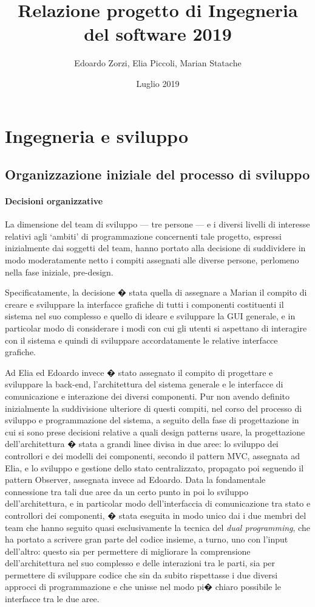 \documentclass[final, smallexted]{svjour3}
\title{Relazione progetto di Ingegneria del software 2019}
\author{Edoardo Zorzi, Elia Piccoli, Marian Statache}
\date{Luglio 2019}
\begin{document}
\maketitle

\newpage
\section{Ingegneria e sviluppo}
\subsection{Organizzazione iniziale del processo di sviluppo}

\paragraph{\textbf{Decisioni organizzative}}
La dimensione del team di sviluppo --- tre persone --- e i diversi livelli di interesse relativi agli `ambiti' di programmazione concernenti tale progetto, espressi inizialmente dai soggetti del team, hanno portato alla decisione di suddividere in modo moderatamente netto i compiti assegnati alle diverse persone, perlomeno nella fase iniziale, pre-design. 

Specificatamente, la decisione � stata quella di assegnare a Marian il compito di creare e sviluppare la interfacce grafiche di tutti i componenti costituenti il sistema nel suo complesso e quello di ideare e sviluppare la GUI generale, e in particolar modo di considerare i modi con cui gli utenti si aspettano di interagire con il sistema e quindi di sviluppare accordatamente le relative interfacce grafiche.

Ad Elia ed Edoardo invece � stato assegnato il compito di progettare e sviluppare la back-end, l'architettura del sistema generale e le interfacce di comunicazione e interazione dei diversi componenti. Pur non avendo definito inizialmente la suddivisione ulteriore di questi compiti, nel corso del processo di sviluppo e programmazione del sistema, a seguito della fase di progettazione in cui si sono prese decisioni relative a quali design patterns usare, la progettazione dell'architettura � stata a grandi linee divisa in due aree: lo sviluppo dei controllori e dei modelli dei componenti, secondo il pattern MVC, assegnata ad Elia, e lo sviluppo e gestione dello stato centralizzato, propagato poi seguendo il pattern Observer, assegnata invece ad Edoardo. Data la fondamentale connessione tra tali due aree da un certo punto in poi lo sviluppo dell'architettura, e in particolar modo dell'interfaccia di comunicazione tra stato e controllori dei componenti, � stata eseguita in modo unico dai i due membri del team che hanno seguito quasi esclusivamente la tecnica del \textit{dual programming}, che ha portato a scrivere gran parte del codice insieme, a turno, uno con l'input dell'altro: questo sia per permettere di migliorare la comprensione dell'architettura nel suo complesso e delle interazioni tra le parti, sia per permettere di sviluppare codice che sin da subito rispettasse i due diversi approcci di programmazione e che unisse nel modo pi� chiaro possibile le interfacce tra le due aree.
\end{document}
